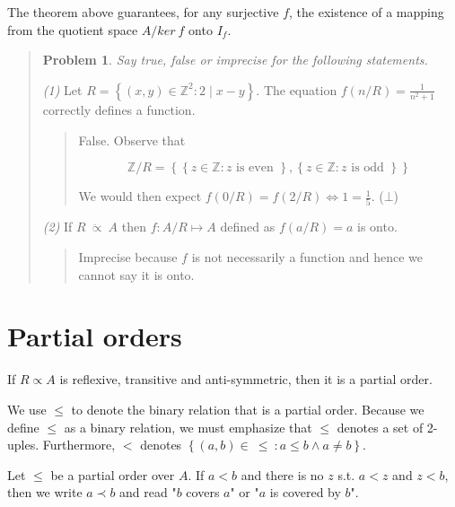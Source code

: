 \documentclass[a4paper, 12pt]{article}
\newtheorem{problem}{Problem}
\newtheorem{problem}{Problem}
\begin{document}
The theorem above guarantees, for any surjective $f$, the existence of a mapping from the quotient space
$A / ker ~ f$ onto $I_f$.


\small
\begin{quote}

\begin{problem}
    Say true, false or imprecise for the following statements.
\end{problem}

\textit{(1)} Let $R = \left\{ (x, y) \in \mathbb{Z}^2 : 2 \mid x - y \right\} $.
The equation $f(n / R) = \frac{1}{n^2 + 1}$ correctly defines a function.

\begin{quote}
    False. Observe that 

    $$\mathbb{Z} / R =  \left\{ \left\{ z \in \mathbb{Z} : z
    \text{ is even }\right\}, \left\{ z \in \mathbb{Z} : z \text{ is odd }
\right\}   \right\} $$

We would then expect $f(0 / R) = f(2 / R) \iff 1 = \frac{1}{5}$. ($\bot$)

\end{quote}

\textit{(2)} If $R ~ \ddot{\propto} ~A$ then $f : A / R \mapsto A$ defined as
$f(a / R) = a$ is onto.

\begin{quote}
    Imprecise because $f$ is not necessarily a function and hence we cannot say
    it is onto.
\end{quote}


\end{quote}
\normalsize


\pagebreak
\section{Partial orders}

\begin{definition}
    If $R \propto A$ is reflexive, transitive and anti-symmetric, then it is a
    partial order.
\end{definition}

We use $\leq$ to denote the binary relation that is a partial order. Because we
define $\leq$ as a binary relation, we must emphasize that $\leq$ denotes a set
of 2-uples. Furthermore, $<$ denotes $\left\{ (a, b) \in ~ \leq ~ : a \leq b \land a
\neq b\right\} $. 

\begin{definition}
    Let $\leq$ be a partial order over $A$. If $a < b$ and there is no $z$ s.t.
    $a < z$ and $z < b$, then we write $a \prec b$ and read "$b$ covers $a$" or
    "$a$ is covered by $b$".
\end{definition}
\end{document}
